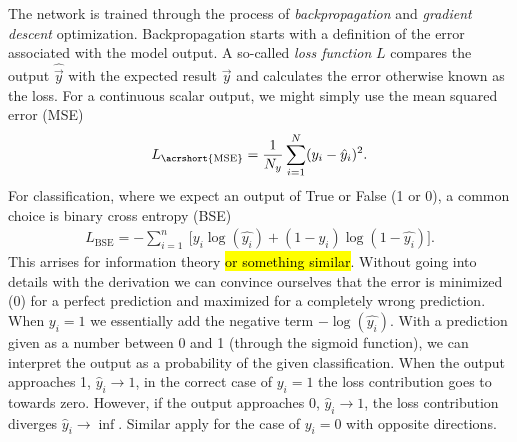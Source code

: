 The network is trained through the process of \textit{backpropagation} and \textit{gradient descent} optimization. Backpropagation starts with a definition of the error associated with the model output. A so-called \textit{loss function} $L$ compares the output $\hat{\vec{y}}$ with the expected result $\vec{y}$ and calculates the error otherwise known as the loss. For a continuous scalar output, we might simply use the mean squared error (\acrshort{MSE})
\begin{align*}
  L_{\text{\acrshort{MSE}}} = \frac{1}{N_y} \sum_{i = 1}^N (y_i - \hat{y}_i)^2.
\end{align*}
For classification, where we expect an output of True or False (1 or 0), a common choice is binary cross entropy (BSE)
\begin{align*}
  L_{\text{BSE}} =  -\sum_{i=1}^n \ \Big[y_i\log(\hat{y_i}) + (1-y_i)\log(1 - \hat{y_i}) \Big].
\end{align*}
This arrises for information theory \hl{or something similar}. Without going into details with the derivation we can convince ourselves that the error is minimized (0) for a perfect prediction and maximized for a completely wrong prediction. When $y_i = 1$ we essentially add the negative term $-\log(\hat{y_i})$. With a prediction given as a number between 0 and 1 (through the sigmoid function), we can interpret the output as a probability of the given classification. When the output approaches 1, $\hat{y}_i \to 1$, in the correct case of $y_i = 1$ the loss contribution goes to towards zero. However, if the output approaches 0, $\hat{y}_i \to 1$, the loss contribution diverges $\hat{y}_i \to \inf$. Similar apply for the case of $y_i = 0$ with opposite directions. 


